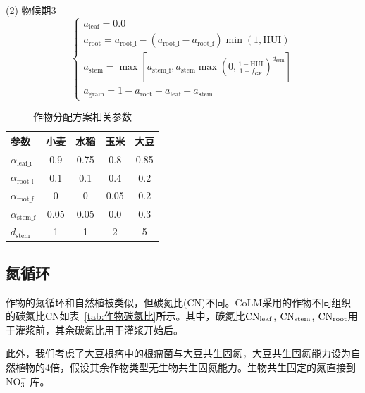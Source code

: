(2)	物候期3 \\
\begin{equation}
  \left\{\begin{array}{c}
      a_{\mathrm{leaf}}=0.0 \\
      a_{\mathrm{root}}=a_{\mathrm{root\_i}}-\left(a_{\mathrm{root\_i}}-a_{\mathrm{root\_f}}\right) \min(1, {\mathrm {HUI}}) \\
      a_{\mathrm{stem}}=\max \left[a_{\mathrm{stem\_f}}, a_{\mathrm{stem}} \max \left(0, \frac{1-{\mathrm {HUI}}}{1-f_{\mathrm{GF}}}\right)^{d_{\mathrm{sem}}}\right] \\
      a_{\mathrm{grain}}=1-a_{\mathrm{root}}-a_{\mathrm{leaf}}-a_{\mathrm{stem}}
  \end{array}\right.
\end{equation}
\begin{table}[htbp]
  \centering
  \caption{作物分配方案相关参数}
  \label{tab:作物分配方案相关参数}
  \begin{tabular}{@{}lcccc@{}}
    \toprule
    参数                        & 小麦 & 水稻 & 玉米 & 大豆 \\ \midrule
    $\alpha_{\mathrm{leaf\_i}}$ & 0.9  & 0.75 & 0.8  & 0.85 \\
    $\alpha_{\mathrm{root\_i}}$ & 0.1  & 0.1  & 0.4  & 0.2  \\
    $\alpha_{\mathrm{root\_f}}$ & 0    & 0    & 0.05 & 0.2  \\
    $\alpha_{\mathrm{stem\_f}}$ & 0.05 & 0.05 & 0.0  & 0.3  \\
    $d_{\mathrm{stem}}$         & 1    & 1    & 2    & 5    \\ \bottomrule
  \end{tabular}
\end{table}

\subsection{氮循环}
作物的氮循环和自然植被类似，但碳氮比(CN)不同。CoLM采用的作物不同组织的碳氮比CN如表~\ref{tab:作物碳氮比}所示。其中，碳氮比${\rm CN_{leaf}}$, ${\rm CN_{stem}}$, ${\rm CN_{root}}$用于灌浆前，其余碳氮比用于灌浆开始后。

此外，我们考虑了大豆根瘤中的根瘤菌与大豆共生固氮，大豆共生固氮能力设为自然植物的4倍，假设其余作物类型无生物共生固氮能力。生物共生固定的氮直接到 $\mathrm{NO_3^-}$ 库。

